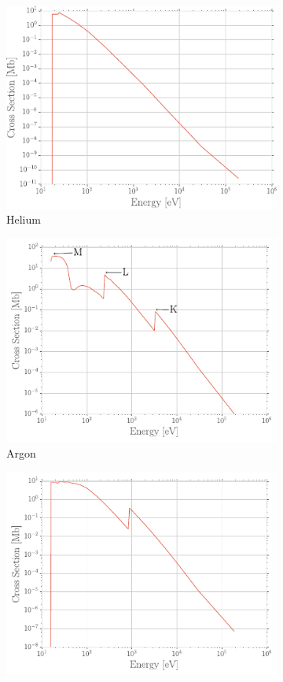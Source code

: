 	\begin{figure}[H]
		\begin{subfigure}{0.5\linewidth}
			\centering
			\includegraphics[width = 0.5\plotwidth]{fig/chapt4/HEED-Helium.pdf}
			\caption{\label{fig:PAIR:A} Helium}
		\end{subfigure}
		\begin{subfigure}{0.5\linewidth}
			\centering
			\includegraphics[width = 0.5\plotwidth]{fig/chapt4/HEED-Argon.pdf}
			\caption{\label{fig:PAIR:B} Argon}
		\end{subfigure}
		\begin{subfigure}{0.5\linewidth}
			\centering
			\includegraphics[width = 0.5\plotwidth]{fig/chapt4/HEED-Neon.pdf}

\end{subfigure}
\end{figure}
